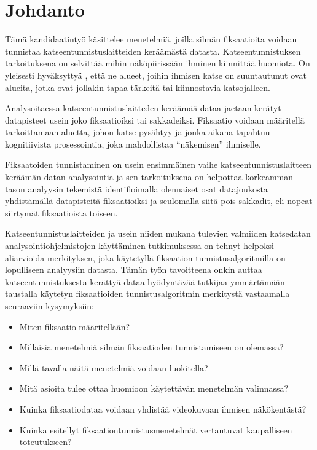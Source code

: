 \section{Johdanto}

Tämä kandidaatintyö käsittelee menetelmiä, joilla silmän fiksaatioita
voidaan tunnistaa katseentunnistuslaitteiden keräämästä datasta. Katseentunnistuksen tarkoituksena on selvittää mihin näköpiirissään ihminen kiinnittää huomiota. On yleisesti hyväksyttyä \citep[s.33]{munn2008}, että ne alueet, joihin ihmisen katse on suuntautunut ovat alueita, jotka ovat jollakin tapaa tärkeitä tai kiinnostavia katsojalleen. 

Analysoitaessa katseentunnistuslaitteden keräämää dataa jaetaan kerätyt datapisteet usein joko fiksaatioiksi tai sakkadeiksi. \citep[s. 71]{salvucci2000} Fiksaatio voidaan määritellä tarkoittamaan aluetta, johon katse pysähtyy \citep[s. 71]{salvucci2000} ja jonka aikana tapahtuu kognitiivista prosessointia, joka mahdollistaa ``näkemisen''  ihmiselle. \citep[s. 881]{Blignaut2009}

Fiksaatoiden tunnistaminen on usein ensimmäinen vaihe katseentunnistuslaitteen keräämän datan analysointia ja sen tarkoituksena on helpottaa korkeamman tason analyysin tekemistä identifioimalla olennaiset osat datajoukosta yhdistämällä datapisteitä fiksaatioiksi ja seulomalla siitä pois sakkadit, eli nopeat siirtymät fiksaatioista toiseen. \citep[s. 18]{mould2012}

Katseentunnistuslaitteiden ja usein niiden mukana tulevien valmiiden katsedatan analysointiohjelmistojen käyttäminen tutkimuksessa on tehnyt helpoksi aliarvioida merkityksen, joka käytetyllä fiksaation tunnistusalgoritmilla on lopulliseen analyysiin datasta. \citep[s. 111]{shic2008}
Tämän työn tavoitteena onkin auttaa katseentunnistuksesta kerättyä dataa hyödyntävää tutkijaa ymmärtämään taustalla käytetyn fiksaatioiden tunnistusalgoritmin merkitystä vastaamalla seuraaviin kysymyksiin:
\begin{itemize}
	\item Miten fiksaatio määritellään?
	\item Millaisia menetelmiä silmän fiksaatioden tunnistamiseen on olemassa?
	\item Millä tavalla näitä menetelmiä voidaan luokitella?
	\item Mitä asioita tulee ottaa huomioon käytettävän menetelmän valinnassa?
	\item Kuinka fiksaatiodataa voidaan yhdistää videokuvaan ihmisen näkökentästä?
	\item Kuinka esitellyt fiksaationtunnistusmenetelmät vertautuvat kaupalliseen toteutukseen?
\end{itemize}

